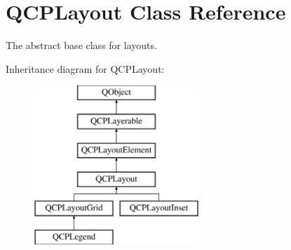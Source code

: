 \hypertarget{class_q_c_p_layout}{}\section{Q\+C\+P\+Layout Class Reference}
\label{class_q_c_p_layout}


The abstract base class for layouts.  


Inheritance diagram for Q\+C\+P\+Layout\+:\begin{figure}[H]
\begin{center}
\leavevmode
\includegraphics[height=6.000000cm]{class_q_c_p_layout}
\end{center}
\end{figure}
